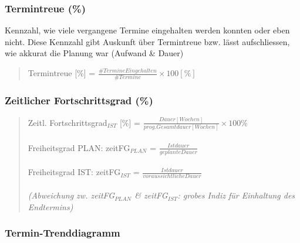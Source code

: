 \documentclass[a4paper]{article}
\begin{document}
		\subsubsection{Termintreue (\%)}
		
		Kennzahl, wie viele vergangene Termine eingehalten werden konnten oder eben nicht.
		Diese Kennzahl gibt Auskunft über Termintreue bzw. lässt aufschliessen, wie akkurat die Planung war (Aufwand \& Dauer)
		
		\begin{quote}
			Termintreue [\%] = $\frac{\#TermineEingehalten}{\#Termine} \times 100[\%]$
		\end{quote}
	
		\subsubsection{Zeitlicher Fortschrittsgrad (\%)}
		
		\begin{quote}
			Zeitl. Fortschrittsgrad$_{IST}$ [\%] = $\frac{Dauer[Wochen]}{prog.Gesamtdauer[Wochen]} \times 100\%$\\
			\\
			Freiheitsgrad PLAN: zeitFG$_{PLAN}$ = $\frac{Istdauer}{geplante Dauer}$\\
			\\
			Freiheitsgrad IST: zeitFG$_{IST}$ = $\frac{Istdauer}{voraussichtliche Dauer}$\\
			\\
			\textit{(Abweichung zw. zeitFG$_{PLAN}$ \& zeitFG$_{IST}$: grobes Indiz für Einhaltung des Endtermins)}
		\end{quote}
		
		\subsubsection{Termin-Trenddiagramm}
		
\end{document}

